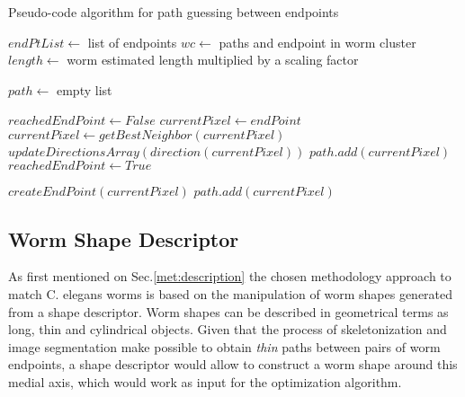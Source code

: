 \begin{algorithm}                     
\caption{Pseudo-code algorithm for path guessing between endpoints}         
\label{guess}                    
\begin{algorithmic}                   

\STATE $endPtList \leftarrow$ list of endpoints
\STATE $wc \leftarrow$ paths and endpoint in worm cluster 
\STATE $length \leftarrow$ worm estimated length multiplied by a scaling factor
\STATE {}
\ENDIF
{}

\STATE $path \leftarrow$ empty list

\STATE $reachedEndPoint \leftarrow False$
\STATE $currentPixel \leftarrow endPoint$
\STATE $currentPixel \leftarrow getBestNeighbor(currentPixel)$
\STATE $updateDirectionsArray(direction(currentPixel))$
\STATE $path.add(currentPixel)$
\STATE $reachedEndPoint \leftarrow True$
\ENDIF
\ENDWHILE 

\STATE $createEndPoint(currentPixel)$
\STATE $path.add(currentPixel)$
\ELSE
\STATE {}
\ENDIF
\ENDIF
\ENDFOR

\end{algorithmic}
\end{algorithm}

\subsection{Worm Shape Descriptor}
\label{sec:metshapedescriptor}

As first mentioned on Sec.\ref{met:description} the chosen methodology approach 
to match C. elegans worms is based on the manipulation of 
worm shapes generated from a shape descriptor.
Worm shapes can be described in geometrical terms as long, thin and cylindrical 
objects. Given that the process of skeletonization and image segmentation 
make possible to obtain \emph{thin} paths between pairs of worm endpoints, 
a shape descriptor would allow to construct a worm shape around this
medial axis, which would work as input for the 
optimization algorithm. \\


